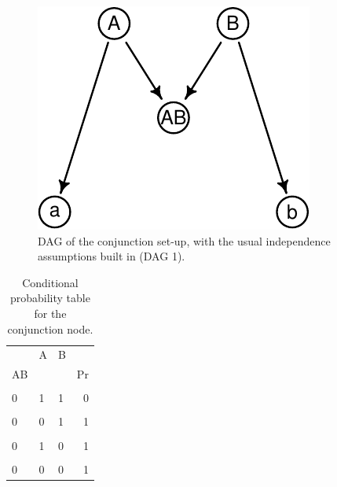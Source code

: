 \documentclass[
  10pt,
  dvipsnames,enabledeprecatedfontcommands]{scrartcl}
\begin{document}
\begin{figure}[H]

\begin{center}\includegraphics[width=0.6\linewidth]{conjunction-paradox4_files/figure-latex/fig:conjunctionDAG-1} \end{center}

\caption{\textsf{DAG} of the conjunction set-up, with the usual independence assumptions built in (\textsf{DAG 1}).}
\label{fig:conjunctionDAGchapter}
\end{figure}

\pagebreak 
\begin{table}
\begin{tabular}{lllr}
\toprule
\multicolumn{1}{c}{} & \multicolumn{1}{c}{A} & \multicolumn{1}{c}{B} & \multicolumn{1}{c}{} \\
AB &  &  & Pr\\
\midrule
\cellcolor{gray!6}{1} & \cellcolor{gray!6}{1} & \cellcolor{gray!6}{1} & \cellcolor{gray!6}{1}\\
0 & 1 & 1 & 0\\
\cellcolor{gray!6}{1} & \cellcolor{gray!6}{0} & \cellcolor{gray!6}{1} & \cellcolor{gray!6}{0}\\
0 & 0 & 1 & 1\\
\cellcolor{gray!6}{1} & \cellcolor{gray!6}{1} & \cellcolor{gray!6}{0} & \cellcolor{gray!6}{0}\\
0 & 1 & 0 & 1\\
\cellcolor{gray!6}{1} & \cellcolor{gray!6}{0} & \cellcolor{gray!6}{0} & \cellcolor{gray!6}{0}\\
0 & 0 & 0 & 1\\
\bottomrule
\end{tabular}

\caption{Conditional probability table for the conjunction node.}
\label{tab:CPTconjunction}
\end{table}
\end{document}
